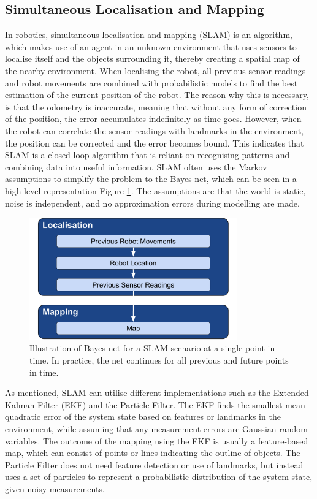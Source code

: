 \subsection{Simultaneous Localisation and Mapping}
In robotics, simultaneous localisation and mapping (\gls{SLAM}) is an algorithm, which makes use of an agent in an unknown environment that uses sensors to localise itself and the objects surrounding it, thereby creating a spatial map of the nearby environment. When localising the robot, all previous sensor readings and robot movements are combined with probabilistic models to find the best estimation of the current position of the robot. The reason why this is necessary, is that the odometry is inaccurate, meaning that without any form of correction of the position, the error accumulates indefinitely as time goes. However, when the robot can correlate the sensor readings with landmarks in the environment, the position can be corrected and the error becomes bound. This indicates that \gls{SLAM} is a closed loop algorithm that is reliant on recognising patterns and combining data into useful information. \gls{SLAM} often uses the Markov assumptions to simplify the problem to the Bayes net, which can be seen in a high-level representation Figure \ref{fig:bayer_net}. The assumptions are that the world is static, noise is independent, and no approximation errors during modelling are made. \cite{SLAM:3D_SLAM}

\begin{figure}[H]
    \centering
    \includegraphics[width=0.8\textwidth]{figures/1Problem_analysis/Bayes_net.pdf}
    \caption{Illustration of Bayes net for a \gls{SLAM} scenario at a single point in time. In practice, the net continues for all previous and future points in time.}
    \label{fig:bayer_net}
\end{figure}

As mentioned, \gls{SLAM} can utilise different implementations such as the Extended Kalman Filter (\gls{EKF}) and the Particle Filter. The \gls{EKF} finds the smallest mean quadratic error of the system state based on features or landmarks in the environment, while assuming that any measurement errors are Gaussian random variables. The outcome of the mapping using the \gls{EKF} is usually a feature-based map, which can consist of points or lines indicating the outline of objects. The Particle Filter does not need feature detection or use of landmarks, but instead uses a set of particles to represent a probabilistic distribution of the system state, given noisy measurements. \cite{SLAM:ExtendedKalman_Particle}

